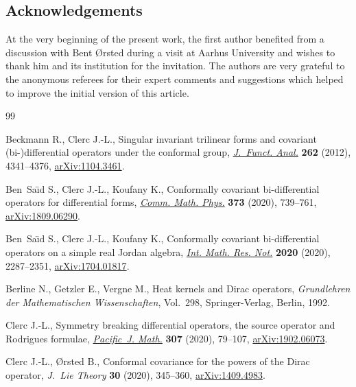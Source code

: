\documentclass[10pt,a4paper]{amsart}
\numberwithin{equation}{section}
\begin{document}
\subsection*{Acknowledgements}
 At the very beginning of the present work, the first author benefited from a discussion with Bent {\O}rsted during a visit at Aarhus University and wishes to thank him and its institution for the invitation. The authors are very grateful to the anonymous referees for their expert comments and suggestions which helped to improve the initial version of this article.


\begin{thebibliography}{99}
\footnotesize\itemsep=0pt

Beckmann R., Clerc J.-L., Singular invariant trilinear forms and covariant
 (bi-)differential operators under the conformal group, \href{https://doi.org/10.1016/j.jfa.2012.02.021}{\textit{J.~Funct.
 Anal.}} \textbf{262} (2012), 4341--4376, \href{https://arxiv.org/abs/1104.3461}{arXiv:1104.3461}.

Ben~Sa\"{\i}d S., Clerc J.-L., Koufany K., Conformally covariant bi-differential
 operators for differential forms, \href{https://doi.org/10.1007/s00220-019-03431-6}{\textit{Comm. Math. Phys.}} \textbf{373}
 (2020), 739--761, \href{https://arxiv.org/abs/1809.06290}{arXiv:1809.06290}.

Ben~Sa\"{\i}d S., Clerc J.-L., Koufany K., Conformally covariant bi-differential
 operators on a simple real {J}ordan algebra, \href{https://doi.org/10.1093/imrn/rny082}{\textit{Int. Math. Res. Not.}}
 \textbf{2020} (2020), 2287--2351, \href{https://arxiv.org/abs/1704.01817}{arXiv:1704.01817}.

Berline N., Getzler E., Vergne M., Heat kernels and {D}irac operators,
 \textit{Grundlehren der Mathematischen Wissenschaften}, Vol.~298, Springer-Verlag, Berlin, 1992.

Clerc J.-L., Symmetry breaking differential operators, the source operator and
 {R}odrigues formulae, \href{https://doi.org/10.2140/pjm.2020.307.79}{\textit{Pacific~J. Math.}} \textbf{307} (2020), 79--107,
 \href{https://arxiv.org/abs/1902.06073}{arXiv:1902.06073}.

Clerc J.-L., {\O}rsted B., Conformal covariance for the powers of the {D}irac
 operator, \textit{J.~Lie Theory} \textbf{30} (2020), 345--360,
 \href{https://arxiv.org/abs/1409.4983}{arXiv:1409.4983}.


\end{thebibliography}
\end{document}
